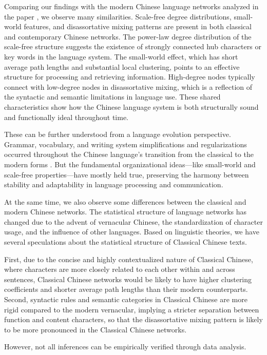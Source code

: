 \documentclass[11pt]{article}
\begin{document}
Comparing our findings with the modern Chinese language networks analyzed in the paper \cite{ZHOU20083039}, we observe many similarities.  Scale-free degree distributions, small-world features, and disassortative mixing patterns are present in both classical and contemporary Chinese networks. The power-law degree distribution of the scale-free structure suggests the existence of strongly connected hub characters or key words in the language system. The small-world effect, which has short average path lengths and substantial local clustering, points to an effective structure for processing and retrieving information. High-degree nodes typically connect with low-degree nodes in disassortative mixing, which is a reflection of the syntactic and semantic limitations in language use. These shared characteristics show how the Chinese language system is both structurally sound and functionally ideal throughout time.

These can be further understood from a language evolution perspective. Grammar, vocabulary, and writing system simplifications and regularizations occurred throughout the Chinese language's transition from the classical to the modern forms \cite{chen1999modern}. But the fundamental organizational ideas—like small-world and scale-free properties—have mostly held true, preserving the harmony between stability and adaptability in language processing and communication.

At the same time, we also observe some differences between the classical and modern Chinese networks. The statistical structure of language networks has changed due to the advent of vernacular Chinese, the standardization of character usage, and the influence of other languages. Based on linguistic theories, we have several speculations about the statistical structure of Classical Chinese texts.

First, due to the concise and highly contextualized nature of Classical Chinese, where characters are more closely related to each other within and across sentences, Classical Chinese networks would be likely to have higher clustering coefficients and shorter average path lengths than their modern counterparts. Second, syntactic rules and semantic categories in Classical Chinese are more rigid compared to the modern vernacular,  implying a stricter separation between function and content characters, so that the disassortative mixing pattern is likely to be more pronounced in the Classical Chinese networks. 

However, not all inferences can be empirically verified through data analysis.
\end{document}
